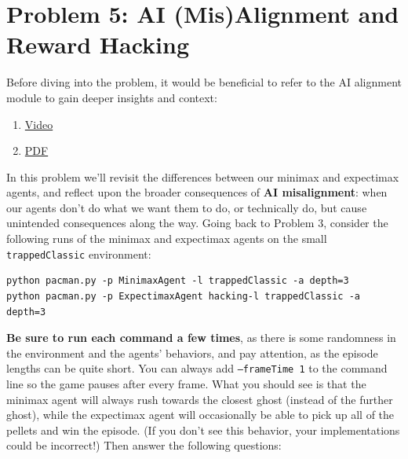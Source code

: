 \documentclass{article}
\theoremstyle{case}
\theoremstyle{definition}
\begin{document}
\section*{Problem 5: AI (Mis)Alignment and Reward Hacking}
Before diving into the problem, it would be beneficial to refer to the AI alignment module to gain deeper insights and context:
\begin{enumerate}
    \item \href{https://www.youtube.com/watch?v=5WHObJWE1FE&t=5s}{Video}
    \item \href{https://stanford-cs221.github.io/spring2024-extra/modules/games/ai-alignment-problem.pdf}{PDF}
\end{enumerate}
In this problem we'll revisit the differences between our minimax and expectimax agents, and reflect upon the broader consequences of \textbf{AI misalignment}: when our agents don't do what we want them to do, or technically do, but cause unintended consequences along the way. Going back to Problem 3, consider the following runs of the minimax and expectimax agents on the small \texttt{trappedClassic} environment:

\begin{verbatim}
python pacman.py -p MinimaxAgent -l trappedClassic -a depth=3
python pacman.py -p ExpectimaxAgent hacking-l trappedClassic -a depth=3
\end{verbatim}

\textbf{Be sure to run each command a few times}, as there is some randomness in the environment and the agents' behaviors, and pay attention, as the episode lengths can be quite short. You can always add \texttt{--frameTime 1} to the command line so the game pauses after every frame. What you should see is that the minimax agent will always rush towards the closest ghost (instead of the further ghost), while the expectimax agent will occasionally be able to pick up all of the pellets and win the episode. (If you don't see this behavior, your implementations could be incorrect!) Then answer the following questions:
\end{document}
